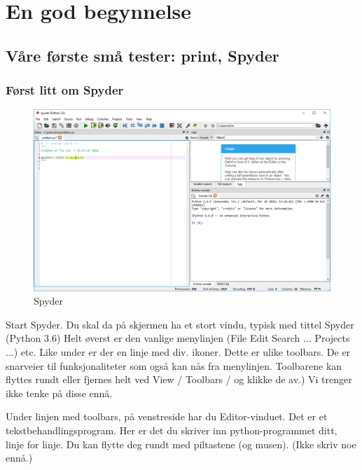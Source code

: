 \chapter{En god begynnelse}
\section{Våre første små tester: print, Spyder}
\subsection*{Først litt om Spyder}
\begin{figure}[h]
\begin{center}
\includegraphics[width=1.0\textwidth]{img/spyder_overview.png}
\end{center}
\caption{Spyder}
\label{fig:spyder_overview}
\end{figure}

Start Spyder. Du skal da på skjermen ha et stort vindu, typisk med tittel Spyder (Python 3.6) Helt øverst er den vanlige menylinjen (File Edit Search ... Projects ...) etc. Like under er der en linje med div. ikoner. Dette er ulike toolbars. De er snarveier til funksjonaliteter som også kan nås fra menylinjen. Toolbarene kan flyttes rundt eller fjernes helt ved View / Toolbars / og klikke de av.) Vi trenger ikke tenke på disse ennå. 

Under linjen med toolbars, på venstreside har du Editor-vinduet. Det er et tekstbehandlingsprogram.  Her er det du skriver inn python-programmet ditt, linje for linje. Du kan flytte deg rundt med piltastene (og musen). (Ikke skriv noe ennå.) 

